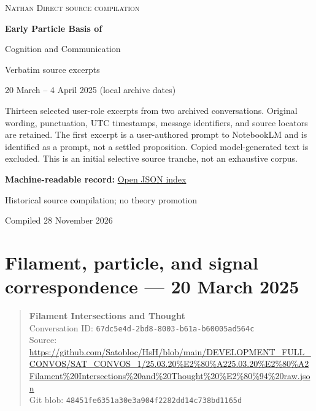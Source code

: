 \documentclass[11pt,letterpaper]{article}
\begin{document}
\begin{titlepage}
\centering
\vspace*{1.15in}
{\Large\textsc{Nathan Direct source compilation}\par}
\vspace{0.45in}
{\huge\bfseries Early Particle Basis of\par Cognition and Communication\par}
\vspace{0.22in}
{\large Verbatim source excerpts\par}
\vspace{0.7in}
{\large 20 March -- 4 April 2025 (local archive dates)\par}
\vfill
\begin{minipage}{0.84\textwidth}
\small
Thirteen selected user-role excerpts from two archived conversations. Original wording, punctuation, UTC timestamps, message identifiers, and source locators are retained. The first excerpt is a user-authored prompt to NotebookLM and is identified as a prompt, not a settled proposition. Copied model-generated text is excluded. This is an initial selective source tranche, not an exhaustive corpus.\par\vspace{8pt}\textbf{Machine-readable record:} \href{https://github.com/Satobloc/HsH/blob/main/indexes/nathan-direct/nathan-direct-early-cognition-communication-2025.json}{Open JSON index}
\end{minipage}
\vfill
{\small Historical source compilation; no theory promotion\par}
{\small Compiled 28 November 2026\par}
\end{titlepage}

\section*{Filament, particle, and signal correspondence --- 20 March 2025}
\begin{quote}\small
\textbf{Filament Intersections and Thought}\\
Conversation ID: \texttt{67dc5e4d-2bd8-8003-b61a-b60005ad564c}\\
Source: \url{https://github.com/Satobloc/HsH/blob/main/DEVELOPMENT_FULL_CONVOS/SAT_CONVOS_1/25.03.20%E2%80%A225.03.20%E2%80%A2Filament%20Intersections%20and%20Thought%20%E2%80%94%20raw.json}\\
Git blob: \texttt{48451fe6351a30e3a904f2282dd14c738bd1165d}
\end{quote}
\end{document}
